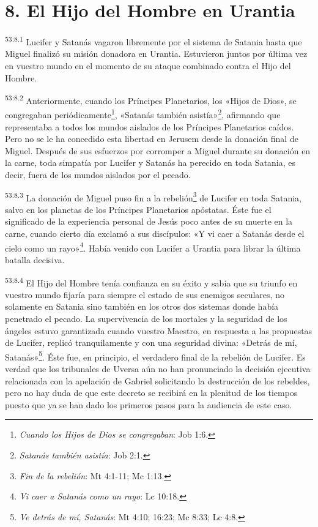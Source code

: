 \section*{8. El Hijo del Hombre en Urantia}
\par
\textsuperscript{53:8.1} Lucifer y Satanás vagaron libremente por el sistema de Satania hasta que Miguel finalizó su misión donadora en Urantia. Estuvieron juntos por última vez en vuestro mundo en el momento de su ataque combinado contra el Hijo del Hombre.

\par
\textsuperscript{53:8.2} Anteriormente, cuando los Príncipes Planetarios, los «Hijos de Dios», se congregaban periódicamente\footnote{\textit{Cuando los Hijos de Dios se congregaban}: Job 1:6.}, «Satanás también asistía»\footnote{\textit{Satanás también asistía}: Job 2:1.}, afirmando que representaba a todos los mundos aislados de los Príncipes Planetarios caídos. Pero no se le ha concedido esta libertad en Jerusem desde la donación final de Miguel. Después de sus esfuerzos por corromper a Miguel durante su donación en la carne, toda simpatía por Lucifer y Satanás ha perecido en toda Satania, es decir, fuera de los mundos aislados por el pecado.

\par
\textsuperscript{53:8.3} La donación de Miguel puso fin a la rebelión\footnote{\textit{Fin de la rebelión}: Mt 4:1-11; Mc 1:13.} de Lucifer en toda Satania, salvo en los planetas de los Príncipes Planetarios apóstatas. Éste fue el significado de la experiencia personal de Jesús poco antes de su muerte en la carne, cuando cierto día exclamó a sus discípulos: «Y vi caer a Satanás desde el cielo como un rayo»\footnote{\textit{Vi caer a Satanás como un rayo}: Lc 10:18.}. Había venido con Lucifer a Urantia para librar la última batalla decisiva.

\par
\textsuperscript{53:8.4} El Hijo del Hombre tenía confianza en su éxito y sabía que su triunfo en vuestro mundo fijaría para siempre el estado de sus enemigos seculares, no solamente en Satania sino también en los otros dos sistemas donde había penetrado el pecado. La supervivencia de los mortales y la seguridad de los ángeles estuvo garantizada cuando vuestro Maestro, en respuesta a las propuestas de Lucifer, replicó tranquilamente y con una seguridad divina: «Detrás de mí, Satanás»\footnote{\textit{Ve detrás de mí, Satanás}: Mt 4:10; 16:23; Mc 8:33; Lc 4:8.}. Éste fue, en principio, el verdadero final de la rebelión de Lucifer. Es verdad que los tribunales de Uversa aún no han pronunciado la decisión ejecutiva relacionada con la apelación de Gabriel solicitando la destrucción de los rebeldes, pero no hay duda de que este decreto se recibirá en la plenitud de los tiempos puesto que ya se han dado los primeros pasos para la audiencia de este caso.

